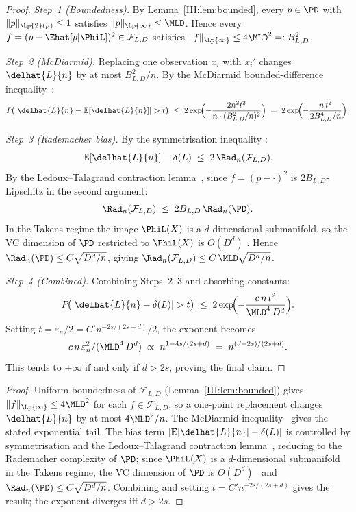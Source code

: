 \ifdraft
\begin{proof}
\emph{Step~1 (Boundedness).}
By Lemma~\ref{III:lem:bounded}, every $p \in \PD$ with $\|p\|_{\Lp{2}(\mu)} \leq 1$
satisfies $\|p\|_{\Lp{\infty}} \leq \MLD$.
Hence every $f = (p - \Ehat[p|\PhiL])^2 \in \mathcal{F}_{L,D}$ satisfies
$\|f\|_{\Lp{\infty}} \leq 4\MLD^2 =: B_{L,D}^2$.

\emph{Step~2 (McDiarmid).}
Replacing one observation $x_i$ with $x_i'$ changes
$\delhat{L}{n}$ by at most $B_{L,D}^2/n$.
By the McDiarmid bounded-difference inequality~\cite{McDiarmid1989}:
\[
  P\!\bigl(|\delhat{L}{n} - \mathbb{E}[\delhat{L}{n}]| > t\bigr)
  \;\leq\; 2\exp\!\Bigl(-\frac{2n^2 t^2}{n \cdot (B_{L,D}^2/n)^2}\Bigr)
  \;=\; 2\exp\!\Bigl(-\frac{n\,t^2}{2B_{L,D}^4/n}\Bigr).
\]

\emph{Step~3 (Rademacher bias).}
By the symmetrisation inequality \cite{BartlettMendelson2002}:
\[
  \mathbb{E}[\delhat{L}{n}] - \delta(L)
  \;\leq\; 2\,\Rad_n(\mathcal{F}_{L,D}).
\]
By the Ledoux--Talagrand contraction lemma~\cite{LedouxTalagrand1991}, since $f = (p - \cdot)^2$ is
$2B_{L,D}$-Lipschitz in the second argument:
\[
  \Rad_n(\mathcal{F}_{L,D})
  \;\leq\; 2B_{L,D}\,\Rad_n(\PD).
\]
In the Takens regime the image $\PhiL(X)$ is a $d$-dimensional submanifold,
so the VC dimension of $\PD$ restricted to $\PhiL(X)$ is
$O(D^d)$ \cite{Gyorfi2002}.
Hence $\Rad_n(\PD) \leq C\sqrt{D^d/n}$, giving
$\Rad_n(\mathcal{F}_{L,D}) \leq C\,\MLD\sqrt{D^d/n}$.

\emph{Step~4 (Combined).}
Combining Steps~2--3 and absorbing constants:
\[
  P\!\bigl(|\delhat{L}{n} - \delta(L)| > t\bigr)
  \;\leq\; 2\exp\!\Bigl(-\frac{c\,n\,t^2}{\MLD^4\,D^d}\Bigr).
\]
Setting $t = \varepsilon_n/2 = C'n^{-2s/(2s+d)}/2$, the exponent becomes
\[
  c\,n\,\varepsilon_n^2 / (\MLD^4\,D^d)
  \;\propto\; n^{1-4s/(2s+d)}
  \;=\; n^{(d-2s)/(2s+d)}.
\]
This tends to $+\infty$ if and only if $d > 2s$,
proving the final claim.
\end{proof}
\else
\begin{proof}
Uniform boundedness of $\mathcal{F}_{L,D}$ (Lemma~\ref{III:lem:bounded}) gives
$\|f\|_{\Lp{\infty}} \leq 4\MLD^2$ for each $f \in \mathcal{F}_{L,D}$, so a
one-point replacement changes $\delhat{L}{n}$ by at most $4\MLD^2/n$.
The McDiarmid inequality~\cite{McDiarmid1989} gives the stated exponential tail.
The bias term $|\mathbb{E}[\delhat{L}{n}] - \delta(L)|$ is controlled by
symmetrisation and the Ledoux--Talagrand contraction lemma~\cite{LedouxTalagrand1991},
reducing to the Rademacher complexity of $\PD$; since $\PhiL(X)$ is a
$d$-dimensional submanifold in the Takens regime, the VC dimension of $\PD$
is $O(D^d)$~\cite{Gyorfi2002} and $\Rad_n(\PD) \leq C\sqrt{D^d/n}$.
Combining and setting $t = C'n^{-2s/(2s+d)}$ gives the result; the exponent
diverges iff $d > 2s$.
\end{proof}
\fi

